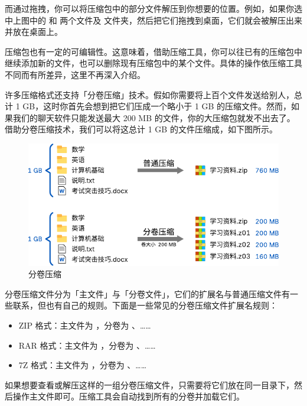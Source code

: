 {而通过拖拽，你可以将压缩包中的部分文件解压到你想要的位置。例如，如果你选中上图中的  和  两个文件及  文件夹，然后把它们拖拽到桌面，它们就会被解压出来并放在桌面上。

\begin{note}
  压缩包也有一定的可编辑性。这意味着，借助压缩工具，你可以往已有的压缩包中继续添加新的文件，也可以删除现有压缩包中的某个文件。具体的操作依压缩工具不同而有所差异，这里不再深入介绍。
\end{note}

许多压缩格式还支持「分卷压缩」技术。假如你需要将上百个文件发送给别人，总计 1 GB，这时你首先会想到把它们压成一个略小于 1 GB 的压缩文件。然而，如果我们的聊天软件只能发送最大 200 MB 的文件，你的大压缩包就发不出去了。借助分卷压缩技术，我们可以将这总计 1 GB 的文件压缩成，如下图所示。

\begin{figure}[htb!]
  \centering
  \includegraphics[width=.7\textwidth]{assets/software/Split_archive.pdf}
  \caption{分卷压缩}
  \label{fig:Split_archive}
\end{figure}

分卷压缩文件分为「主文件」与「分卷文件」，它们的扩展名与普通压缩文件有一些联系，但也有自己的规则。下面是一些常见的分卷压缩文件扩展名规则：
\begin{itemize}
  \item ZIP 格式：主文件为 ，分卷为 、……
  \item RAR 格式：主文件为 ，分卷为 、……
  \item 7Z 格式：主文件为 ，分卷为 、……
\end{itemize}

如果想要查看或解压这样的一组分卷压缩文件，只需要将它们放在同一目录下，然后操作主文件即可。压缩工具会自动找到所有的分卷并加载它们。

}
